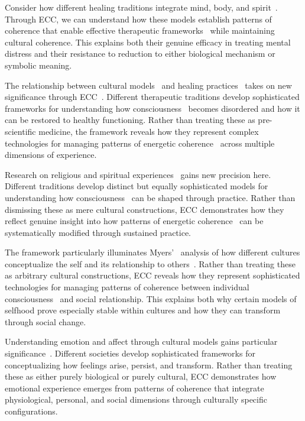 Consider how different healing traditions integrate mind, body, and spirit~\cite{csordas1994sacred,csordas2002body}. Through ECC, we can understand how these models establish patterns of coherence that enable effective therapeutic frameworks~ while maintaining cultural coherence. This explains both their genuine efficacy in treating mental distress and their resistance to reduction to either biological mechanism or symbolic meaning.

The relationship between cultural models~ and healing practices~ takes on new significance through ECC~\cite{csordas1994sacred,desjarlais1992body}. Different therapeutic traditions develop sophisticated frameworks for understanding how consciousness~ becomes disordered and how it can be restored to healthy functioning. Rather than treating these as pre-scientific medicine, the framework reveals how they represent complex technologies for managing patterns of energetic coherence~ across multiple dimensions of experience.

Research on religious and spiritual experiences~\cite{luhrmann2012when,hayles2017unthought} gains new precision here. Different traditions develop distinct but equally sophisticated models for understanding how consciousness~ can be shaped through practice. Rather than dismissing these as mere cultural constructions, ECC demonstrates how they reflect genuine insight into how patterns of energetic coherence~ can be systematically modified through sustained practice.

The framework particularly illuminates Myers'~\cite{myers1986pintupi} analysis of how different cultures conceptualize the self and its relationship to others~\cite{ingold2011being}. Rather than treating these as arbitrary cultural constructions, ECC reveals how they represent sophisticated technologies for managing patterns of coherence between individual consciousness~ and social relationship. This explains both why certain models of selfhood prove especially stable within cultures and how they can transform through social change.

Understanding emotion and affect through cultural models gains particular significance~\cite{wikan1990managing,jackson1996things}. Different societies develop sophisticated frameworks for conceptualizing how feelings arise, persist, and transform. Rather than treating these as either purely biological or purely cultural, ECC demonstrates how emotional experience emerges from patterns of coherence that integrate physiological, personal, and social dimensions through culturally specific configurations.

